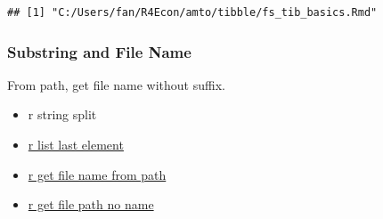 \documentclass[
]{book}
\newenvironment{Shaded}{\begin{snugshade}}{\end{snugshade}}
\newcommand{\AttributeTok}[1]{\textcolor[rgb]{0.77,0.63,0.00}{#1}}
\newcommand{\DecValTok}[1]{\textcolor[rgb]{0.00,0.00,0.81}{#1}}
\newcommand{\FunctionTok}[1]{\textcolor[rgb]{0.00,0.00,0.00}{#1}}
\newcommand{\NormalTok}[1]{#1}
\newcommand{\OtherTok}[1]{\textcolor[rgb]{0.56,0.35,0.01}{#1}}
\newcommand{\SpecialCharTok}[1]{\textcolor[rgb]{0.00,0.00,0.00}{#1}}
\newcommand{\StringTok}[1]{\textcolor[rgb]{0.31,0.60,0.02}{#1}}
\providecommand{\tightlist}{%
  \setlength{\itemsep}{0pt}\setlength{\parskip}{0pt}}
\begin{document}
\begin{verbatim}
## [1] "C:/Users/fan/R4Econ/amto/tibble/fs_tib_basics.Rmd"
\end{verbatim}

\hypertarget{substring-and-file-name}{%
\subsubsection{Substring and File Name}\label{substring-and-file-name}}

From path, get file name without suffix.

\begin{itemize}
\tightlist
\item
  r string split
\item
  \href{https://stackoverflow.com/a/83222/8280804}{r list last element}
\item
  \href{https://stackoverflow.com/a/29114007/8280804}{r get file name from path}
\item
  \href{https://stackoverflow.com/a/47189541/8280804}{r get file path no name}
\end{itemize}

\begin{Shaded}
\end{Shaded}
\end{document}

